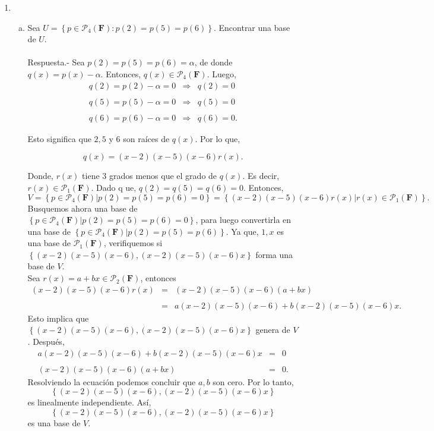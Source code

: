 \begin{enumerate}[\bfseries 1.]
\begin{enumerate}[(a)]
	\end{enumerate}


    \item 
	\begin{enumerate}[(a)]
	
	    \item Sea $U=\left\{p\in \mathcal{P}_4(\textbf{F}):p(2)=p(5)=p(6)\right\}$. Encontrar una base de $U$.\\\\
		Respuesta.-\; Sea $p(2)=p(5)=p(6)=\alpha$, de donde $q(x)=p(x)-\alpha$. Entonces, $q(x)\in \mathcal{P}_4(\textbf{F})$. Luego,
		$$
		\begin{array}{rcl}
		    q(2)=p(2)-\alpha=0&\Rightarrow&q(2)=0\\\\
		    q(5)=p(5)-\alpha=0&\Rightarrow&q(5)=0\\\\
		    q(6)=p(6)-\alpha=0&\Rightarrow&q(6)=0.
		\end{array}
		$$

		Esto significa que $2,5$ y $6$ son raíces de $q(x)$. Por lo que,

		$$q(x)=(x-2)(x-5)(x-6)r(x).$$

		Donde, $r(x)$ tiene $3$ grados menos que el grado de $q(x)$. Es decir, $r(x)\in \mathcal{P}_1(\textbf{F})$. Dado q ue, $q(2)=q(5)=q(6)=0$. Entonces,
		$$V=\left\{p\in \mathcal{P}_4(\textbf{F})|p(2)=p(5)=p(6)=0\right\}=\left\{(x-2)(x-5)(x-6)r(x)|r(x)\in \mathcal{P}_1(\textbf{F})\right\}.$$
		Busquemos ahora una base de $\left\{p\in \mathcal{P}_4(\textbf{F})|p(2)=p(5)=p(6)=0\right\}$, para luego convertirla en una base de $\left\{p\in \mathcal{P}_4(\textbf{F})|p(2)=p(5)=p(6)\right\}$. Ya que, $1,x$ es una base de $\mathcal{P}_1(\textbf{F})$, verifiquemos si $\left\{(x-2)(x-5)(x-6),(x-2)(x-5)(x-6)x\right\}$ forma una base de $V$.\\
		Sea $r(x)=a+bx\in \mathcal{P}_2(\textbf{F})$, entonces
		$$
		\begin{array}{rcl}
		    (x-2)(x-5)(x-6)r(x)&=&(x-2)(x-5)(x-6)(a+bx)\\\\
				       &=&a(x-2)(x-5)(x-6)+b(x-2)(x-5)(x-6)x.
		\end{array}
		$$
		Esto implica que $\left\{(x-2)(x-5)(x-6),(x-2)(x-5)(x-6)x\right\}$ genera de $V$. Después,
		$$
		\begin{array}{rcl}
		    a(x-2)(x-5)(x-6)+b(x-2)(x-5)(x-6)x&=&0\\\\
		    (x-2)(x-5)(x-6)(a+bx)&=&0.
		\end{array}
		$$
		Resolviendo la ecuación podemos concluir que $a,b$ son cero. Por lo tanto, 
		$$\left\{(x-2)(x-5)(x-6),(x-2)(x-5)(x-6)x\right\}$$ 
		es linealmente independiente. Así,
		$$\left\{(x-2)(x-5)(x-6),(x-2)(x-5)(x-6)x\right\}$$
		es una base de $V$.\\


\end{enumerate}
\end{enumerate}
